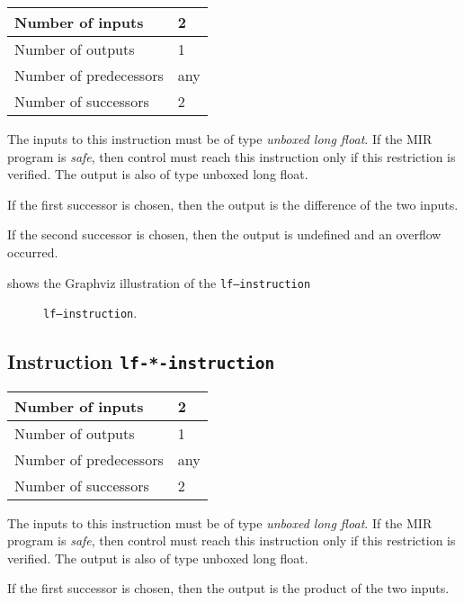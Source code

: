 \begin{tabular}{|l|l|}
\hline
Number of inputs & 2\\
\hline
Number of outputs & 1\\
\hline
Number of predecessors & any\\
\hline
Number of successors & 2\\
\hline
\end{tabular}

The inputs to this instruction must be of type \emph{unboxed long
  float}.  If the MIR program is \emph{safe}, then control must reach
this instruction only if this restriction is verified.  The output is
also of type unboxed long float.

If the first successor is chosen, then the output is
the difference of the two inputs.  

If the second successor is chosen, then the output is undefined and an
overflow occurred. 

 shows the Graphviz illustration of the
\texttt{lf---instruction}

\begin{figure}
\begin{center}
\end{center}
\caption{\label{fig-lf---instruction}
\texttt{lf---instruction}.}
\end{figure}

\subsection{Instruction \texttt{lf-*-instruction}}
\label{mir-instruction-lf-*}

\begin{tabular}{|l|l|}
\hline
Number of inputs & 2\\
\hline
Number of outputs & 1\\
\hline
Number of predecessors & any\\
\hline
Number of successors & 2\\
\hline
\end{tabular}

The inputs to this instruction must be of type \emph{unboxed long
  float}.  If the MIR program is \emph{safe}, then control must reach
this instruction only if this restriction is verified.  The output is
also of type unboxed long float.

If the first successor is chosen, then the output is
the product of the two inputs.  

